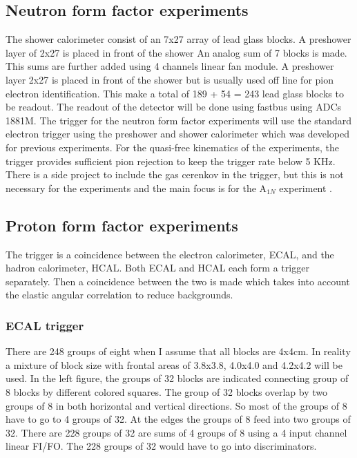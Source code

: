 \documentclass{article}
\begin{document}
\subsection{Neutron form factor experiments}
\label{sec:neutron-trig}
The shower calorimeter consist of an 7x27 array of  lead glass blocks. A preshower layer of 2x27 is placed in front of the shower
An analog sum of 7 blocks is made. This sums are further added using 4 channels linear fan module.
A preshower layer 2x27 is placed in front of the shower but is usually used off line for pion electron identification. 
This make a total of 189 + 54 = 243 lead glass blocks to be readout.
The readout of the detector will be done using fastbus using ADCs 1881M.
 The trigger for the neutron form factor experiments will use the 
standard electron trigger using the preshower and shower calorimeter which was developed for previous experiments. 
For the quasi-free kinematics of the experiments, the trigger provides sufficient pion rejection to keep the
trigger rate below 5 KHz. There is a side project to include the gas cerenkov in the trigger, but this
is not necessary for the experiments and the main focus is for the A$_{1N}$ experiment .

\subsection{Proton form factor experiments}
The trigger is a coincidence between the electron calorimeter, ECAL,  and the hadron calorimeter, HCAL.
Both ECAL and HCAL each form a trigger separately. Then a coincidence between the two is made which
takes into account the elastic angular correlation to reduce backgrounds.

\subsubsection{ECAL trigger}
\label{sec:ecal-trig}
There are 248 groups
of eight when I assume that all blocks are 4x4cm. In reality a mixture
of block size with frontal areas of 3.8x3.8, 4.0x4.0 and 4.2x4.2 will be
used. In the left figure, the groups of 32 blocks are indicated connecting
group of 8 blocks by different colored squares. The group of 32 blocks overlap
by two groups of 8 in both horizontal and vertical directions. So most of the
groups of 8 have to go to 4 groups of 32. At the edges the groups of 8 feed into
two groups of 32. There are 228  groups of 32 are sums of 4 groups of 8 using
a 4 input channel linear FI/FO. The 228 groups of 32 would have to
go into discriminators.
\end{document}
